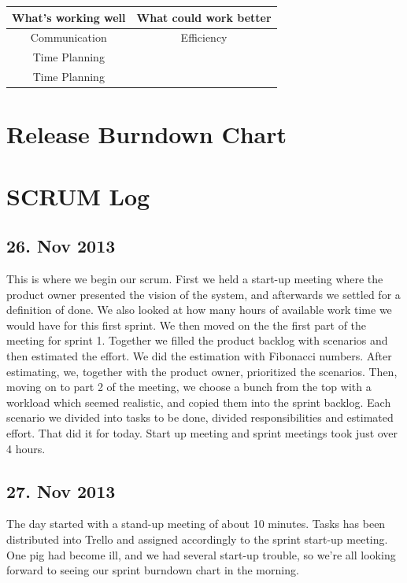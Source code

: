 \documentclass[]{report}
\begin{document}
\begin{center}
\begin{tabular}{|c|c|}
\hline \textbf{What's working well} & \textbf{What could work better} \\ 
\hline Communication & Efficiency \\ 
 Time Planning &  \\ 
 Time Planning &  \\ 
\hline 
\end{tabular} 
\end{center}



\newpage
\chapter{Release Burndown Chart}
\label{chap:Release Burndown Chart}
\begin{center}
\end{center}



\chapter{SCRUM Log}
\label{chap:SCRUM Log}

\section{26. Nov 2013}
This is where we begin our scrum. First we held a start-up meeting where the product owner presented the vision of the system, and afterwards we settled for a definition of done. We also looked at how many hours of available work time we would have for this first sprint. We then moved on the the first part of the meeting for sprint 1. Together we filled the product backlog with scenarios and then estimated the effort. We did the estimation with Fibonacci numbers. After estimating, we, together with the product owner, prioritized the scenarios. Then, moving on to part 2 of the meeting, we choose a bunch from the top with a workload which seemed realistic, and copied them into the sprint backlog. Each scenario we divided into tasks to be done, divided responsibilities and estimated effort. That did it for today. Start up meeting and sprint meetings took just over 4 hours.


\section{27. Nov 2013}
The day started with a stand-up meeting of about 10 minutes. Tasks has been distributed into Trello and assigned accordingly to the sprint start-up meeting. One pig had become ill, and we had several start-up trouble, so we're all looking forward to seeing our sprint burndown chart in the morning.
\end{document}
